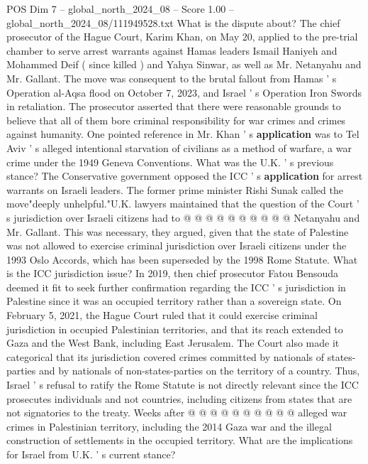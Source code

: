 \begin{textsample}{POS Dim 7 – global\_north\_2024\_08 – Score 1.00 – global\_north\_2024\_08/111949528.txt}  \label{ex:f7_pos_366}
What is the dispute about?
The chief prosecutor of the Hague Court, Karim Khan, on May 20, applied to the pre-trial chamber to serve arrest warrants against Hamas leaders Ismail Haniyeh and Mohammed Deif ( since killed ) and Yahya Sinwar, as well as Mr.
Netanyahu and Mr.
Gallant.
The move was consequent to the brutal fallout from Hamas ' s Operation al-Aqsa flood on October 7, 2023, and Israel ' s Operation Iron Swords in retaliation.
The prosecutor asserted that there were reasonable grounds to believe that all of them bore criminal responsibility for war crimes and crimes against humanity.
One pointed reference in Mr.
Khan ' s \textbf{application} was to Tel Aviv ' s alleged intentional starvation of civilians as a method of warfare, a war crime under the 1949 Geneva Conventions.
What was the U.K. ' s previous stance?
The Conservative government opposed the ICC ' s \textbf{application} for arrest warrants on Israeli leaders.
The former prime minister Rishi Sunak called the move"deeply unhelpful."U.K. lawyers maintained that the question of the Court ' s jurisdiction over Israeli citizens had to @ @ @ @ @ @ @ @ @ @ Netanyahu and Mr.
Gallant.
This was necessary, they argued, given that the state of Palestine was not allowed to exercise criminal jurisdiction over Israeli citizens under the 1993 Oslo Accords, which has been superseded by the 1998 Rome Statute.
What is the ICC jurisdiction issue?
In 2019, then chief prosecutor Fatou Bensouda deemed it fit to seek further confirmation regarding the ICC ' s jurisdiction in Palestine since it was an occupied territory rather than a sovereign state.
On February 5, 2021, the Hague Court ruled that it could exercise criminal jurisdiction in occupied Palestinian territories, and that its reach extended to Gaza and the West Bank, including East Jerusalem.
The Court also made it categorical that its jurisdiction covered crimes committed by nationals of states-parties and by nationals of non-states-parties on the territory of a country.
Thus, Israel ' s refusal to ratify the Rome Statute is not directly relevant since the ICC prosecutes individuals and not countries, including citizens from states that are not signatories to the treaty.
Weeks after @ @ @ @ @ @ @ @ @ @ alleged war crimes in Palestinian territory, including the 2014 Gaza war and the illegal construction of settlements in the occupied territory.
What are the implications for Israel from U.K. ' s current stance?

\end{textsample}

